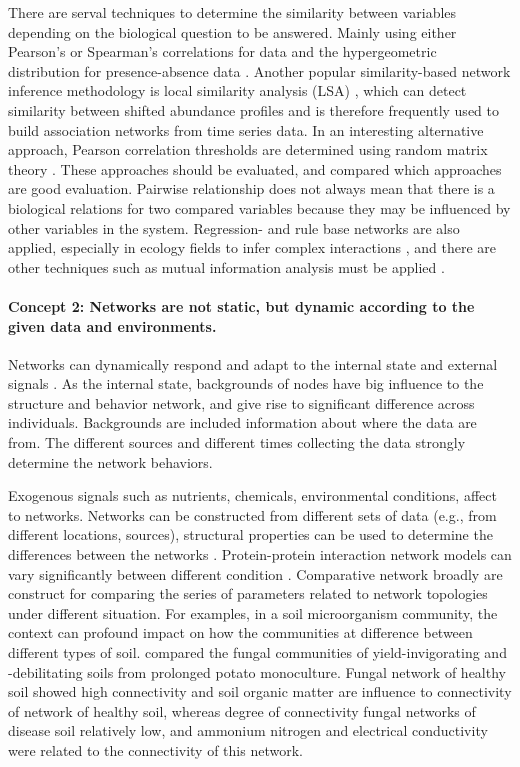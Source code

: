 There are serval techniques to determine the similarity between variables depending on the biological question to be answered. Mainly using either Pearson's or Spearman's correlations for data  and the hypergeometric distribution for presence-absence data . Another popular similarity-based network inference methodology is local similarity analysis (LSA) , which can detect similarity between shifted abundance profiles and is therefore frequently used to build association networks from time series data. In an interesting alternative approach, Pearson correlation thresholds are determined using random matrix theory . These approaches should be evaluated, and compared which approaches are good evaluation. Pairwise relationship does not always mean that there is a biological relations for two compared variables because they may be influenced by other variables in the system. Regression- and rule base networks are also applied, especially in ecology fields to infer complex interactions , and there are other techniques such as mutual information analysis must be applied . 

\paragraph{Concept 2: Networks are not static, but dynamic according to the given data and environments.} 

Networks can dynamically respond and adapt to the internal state and external signals . As the internal state, backgrounds of nodes have big influence to the structure and behavior network, and give rise to significant difference across individuals. Backgrounds are included information about where the data are from. The different sources and different times collecting the data strongly determine the network behaviors. 

Exogenous signals such as nutrients, chemicals, environmental conditions, affect to networks. Networks can be constructed from different sets of data (e.g., from different locations, sources), structural properties can be used to determine the differences between the networks . Protein-protein interaction network models can vary significantly between different condition  . Comparative network broadly are construct for comparing the series of parameters related to network topologies under different situation. For examples, in a soil microorganism community, the context can profound impact on how the communities at difference between different types of soil.  compared the fungal communities of yield-invigorating and -debilitating soils from prolonged potato monoculture. Fungal network of healthy soil showed high connectivity and  soil organic matter are influence to connectivity of network of healthy soil, whereas degree of connectivity fungal networks of disease soil relatively low, and ammonium nitrogen and electrical conductivity were related to the connectivity of this network.

